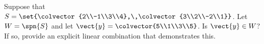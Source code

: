 Suppose that $S=\set{\colvector{2\\-1\\3\\4},\,\colvector{3\\2\\-2\\1}}$. Let $W=\spn{S}$ and let $\vect{y}=\colvector{5\\1\\3\\5}$.  Is $\vect{y}\in W$? If so, provide an explicit linear combination that demonstrates this.